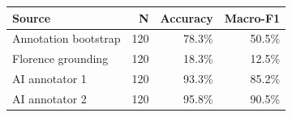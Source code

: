 \begin{tabular}{lrrr}
\toprule
Source & N & Accuracy & Macro-F1 \\
\midrule
Annotation bootstrap & 120 & 78.3\% & 50.5\% \\
Florence grounding & 120 & 18.3\% & 12.5\% \\
AI annotator 1 & 120 & 93.3\% & 85.2\% \\
AI annotator 2 & 120 & 95.8\% & 90.5\% \\
\bottomrule
\end{tabular}

